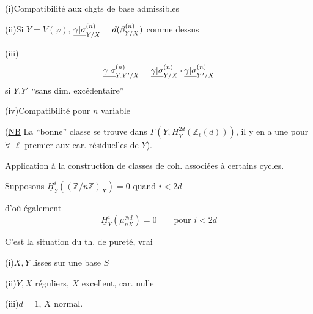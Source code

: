 

(i)\quad Compatibilité aux chgts de base admissibles

(ii)\quad Si $Y=V(\varphi)$,
$\underline{{\gamma|\sigma}}_{Y/X}^{(n)}
=d(\beta_{Y/X}^{(n)})$ comme dessus

(iii)\quad
\[
\underline{{\gamma|\sigma}}_{Y.Y'/X}^{(n)}
=\underline{{\gamma|\sigma}}_{Y/X}^{(n)}
\cdot\underline{{\gamma|\sigma}}_{Y'/X}^{(n)}
\]
si $Y.Y'$ ``sans dim. excédentaire''

\diagram{\begin{tikzcd}[row sep=small]
{}\arrow[d,Rightarrow]\\{}
\end{tikzcd}}

(iv)\quad Compatibilité pour $n$ variable

(\uline{NB} La ``bonne'' classe se trouve dans
$\Gamma(Y,\underline H_Y^{2d}(\mathbb Z_\ell(d)))$, il y en a une pour $\forall$ $\ell$
premier aux car. résiduelles de $Y$).

\uline{Application à la construction de classes de
coh. associées à certains cycles.}

Supposons $\underline H_Y^i((\mathbb Z/n\mathbb Z)_X)=0$  quand $i<2d$

d'où également
\[
\underline H_Y^i(\mu_{nX}^{\otimes d})=0\qquad\text{pour }i<2d
\]

C'est la situation du th. de pureté, vrai

(i)\quad $X,Y$ lisses sur une base $S$

(ii)\quad $Y,X$ réguliers, $X$ excellent, car. nulle

(iii)\quad $d=1$, $X$ normal.

